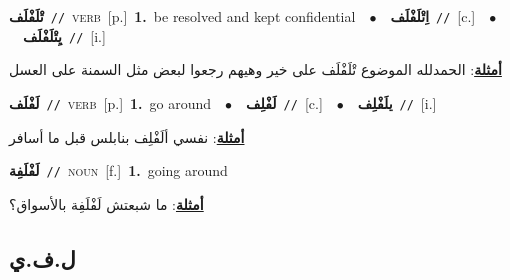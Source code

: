 \documentclass[10pt,a4paper,twoside]{article} %
\begin{document}
\begin{multicols}{2}
{\setlength\topsep{0pt}\textbf{\foreignlanguage{arabic}{تْلَفْلَف}}\ {\color{gray}\texttt{//}\color{black}}\ \textsc{verb}\ [p.]\ \textbf{1.}~be resolved and kept confidential\ \ $\bullet$\ \ \setlength\topsep{0pt}\textbf{\foreignlanguage{arabic}{اِتْلَفْلَف}}\ {\color{gray}\texttt{//}\color{black}}\ [c.]\ \ $\bullet$\ \ \setlength\topsep{0pt}\textbf{\foreignlanguage{arabic}{يِتْلَفْلَف}}\ {\color{gray}\texttt{//}\color{black}}\ [i.]\  \begin{flushright}\color{gray}\foreignlanguage{arabic}{\textbf{\underline{\foreignlanguage{arabic}{أمثلة}}}: الحمدلله الموضوع تْلَفْلَف على خير وهيهم رجعوا لبعض مثل السمنة على العسل}\end{flushright}\color{black}} \vspace{2mm}

{\setlength\topsep{0pt}\textbf{\foreignlanguage{arabic}{لَفْلَف}}\ {\color{gray}\texttt{//}\color{black}}\ \textsc{verb}\ [p.]\ \textbf{1.}~go around\ \ $\bullet$\ \ \setlength\topsep{0pt}\textbf{\foreignlanguage{arabic}{لَفْلِف}}\ {\color{gray}\texttt{//}\color{black}}\ [c.]\ \ $\bullet$\ \ \setlength\topsep{0pt}\textbf{\foreignlanguage{arabic}{يلَفْلِف}}\ {\color{gray}\texttt{//}\color{black}}\ [i.]\  \begin{flushright}\color{gray}\foreignlanguage{arabic}{\textbf{\underline{\foreignlanguage{arabic}{أمثلة}}}: نفسي ألَفْلِف بنابلس قبل ما أسافر}\end{flushright}\color{black}} \vspace{2mm}

{\setlength\topsep{0pt}\textbf{\foreignlanguage{arabic}{لَفْلَفِة}}\ {\color{gray}\texttt{//}\color{black}}\ \textsc{noun}\ [f.]\ \textbf{1.}~going around\  \begin{flushright}\color{gray}\foreignlanguage{arabic}{\textbf{\underline{\foreignlanguage{arabic}{أمثلة}}}: ما شبعتش لَفْلَفِة بالأسواق؟}\end{flushright}\color{black}} \vspace{2mm}

\vspace{-3mm}
\subsection*{\color{blue}\foreignlanguage{arabic}{ل.ف.ي}\color{blue}{}} 


\end{multicols}
\end{document}
